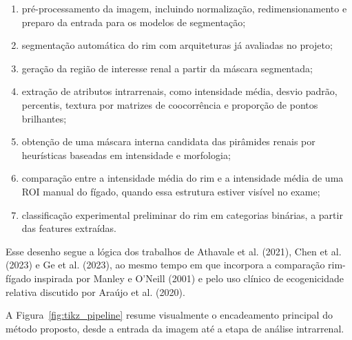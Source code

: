 \documentclass[12pt]{article}
\begin{document}
\begin{enumerate}
\item pré-processamento da imagem, incluindo normalização, redimensionamento e preparo da entrada para os modelos de segmentação;
\item segmentação automática do rim com arquiteturas já avaliadas no projeto;
\item geração da região de interesse renal a partir da máscara segmentada;
\item extração de atributos intrarrenais, como intensidade média, desvio padrão, percentis, textura por matrizes de coocorrência e proporção de pontos brilhantes;
\item obtenção de uma máscara interna candidata das pirâmides renais por heurísticas baseadas em intensidade e morfologia;
\item comparação entre a intensidade média do rim e a intensidade média de uma ROI manual do fígado, quando essa estrutura estiver visível no exame;
\item classificação experimental preliminar do rim em categorias binárias, a partir das features extraídas.
\end{enumerate}

Esse desenho segue a lógica dos trabalhos de Athavale et al. (2021), Chen et al. (2023) e Ge et al. (2023), ao mesmo tempo em que incorpora a comparação rim-fígado inspirada por Manley e O'Neill (2001) e pelo uso clínico de ecogenicidade relativa discutido por Araújo et al. (2020).

A Figura~\ref{fig:tikz_pipeline} resume visualmente o encadeamento principal do método proposto, desde a entrada da imagem até a etapa de análise intrarrenal.
\end{document}
